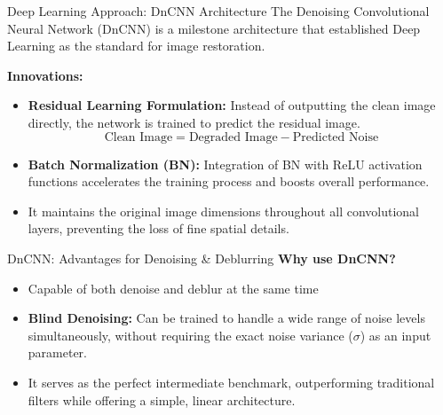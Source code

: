 \documentclass[10pt, handout]{beamer}
\begin{document}
\begin{frame}{Deep Learning Approach: DnCNN Architecture}
    \textbf{} The Denoising Convolutional Neural Network (DnCNN) is a milestone architecture that established Deep Learning as the standard for image restoration.

    \vspace{0.3cm}
    \textbf{Innovations:}
    \begin{itemize}
        \item \textbf{Residual Learning Formulation:} Instead of outputting the clean image directly, the network is trained to predict the residual image. 
        \begin{equation*}
            \text{Clean Image} = \text{Degraded Image} - \text{Predicted Noise}
        \end{equation*}
        \item \textbf{Batch Normalization (BN):} Integration of BN with ReLU activation functions accelerates the training process and boosts overall performance.
        \item \textbf{} It maintains the original image dimensions throughout all convolutional layers, preventing the loss of fine spatial details.
    \end{itemize}
\end{frame}

\begin{frame}{DnCNN: Advantages for Denoising \& Deblurring}
    \textbf{Why use DnCNN?}

    \vspace{0.3cm}
    \begin{itemize}
        \item \textbf{}Capable of both denoise and deblur at the same time
        \item \textbf{Blind Denoising:} Can be trained to handle a wide range of noise levels simultaneously, without requiring the exact noise variance ($\sigma$) as an input parameter.
        \item \textbf{}It serves as the perfect intermediate benchmark, outperforming traditional filters while offering a simple, linear architecture.
    \end{itemize}

\end{frame}
\end{document}
